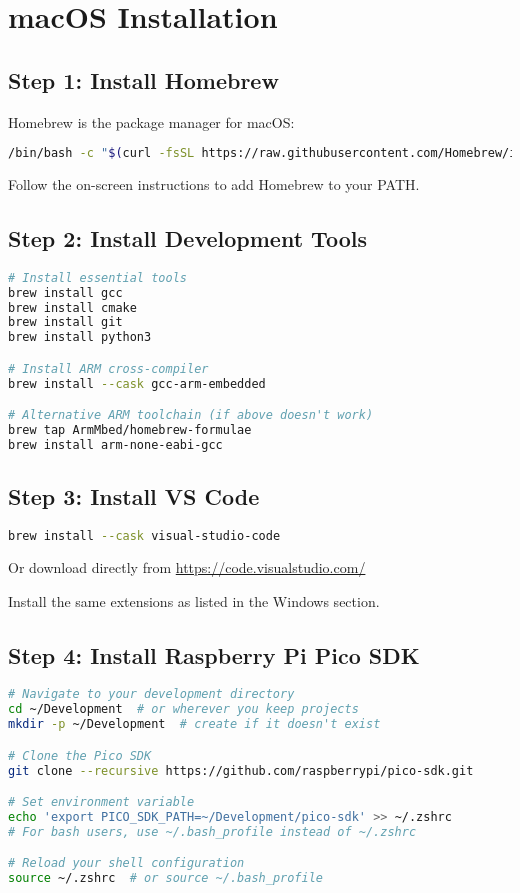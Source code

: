 \documentclass[11pt,a4paper]{article}
\begin{document}
\section{macOS Installation}

\subsection{Step 1: Install Homebrew}
Homebrew is the package manager for macOS:

\begin{lstlisting}[language=bash]
/bin/bash -c "$(curl -fsSL https://raw.githubusercontent.com/Homebrew/install/HEAD/install.sh)"
\end{lstlisting}

Follow the on-screen instructions to add Homebrew to your PATH.

\subsection{Step 2: Install Development Tools}
\begin{lstlisting}[language=bash]
# Install essential tools
brew install gcc
brew install cmake
brew install git
brew install python3

# Install ARM cross-compiler
brew install --cask gcc-arm-embedded

# Alternative ARM toolchain (if above doesn't work)
brew tap ArmMbed/homebrew-formulae
brew install arm-none-eabi-gcc
\end{lstlisting}

\subsection{Step 3: Install VS Code}
\begin{lstlisting}[language=bash]
brew install --cask visual-studio-code
\end{lstlisting}

Or download directly from \url{https://code.visualstudio.com/}

Install the same extensions as listed in the Windows section.

\subsection{Step 4: Install Raspberry Pi Pico SDK}
\begin{lstlisting}[language=bash]
# Navigate to your development directory
cd ~/Development  # or wherever you keep projects
mkdir -p ~/Development  # create if it doesn't exist

# Clone the Pico SDK
git clone --recursive https://github.com/raspberrypi/pico-sdk.git

# Set environment variable
echo 'export PICO_SDK_PATH=~/Development/pico-sdk' >> ~/.zshrc
# For bash users, use ~/.bash_profile instead of ~/.zshrc

# Reload your shell configuration
source ~/.zshrc  # or source ~/.bash_profile
\end{lstlisting}
\end{document}

